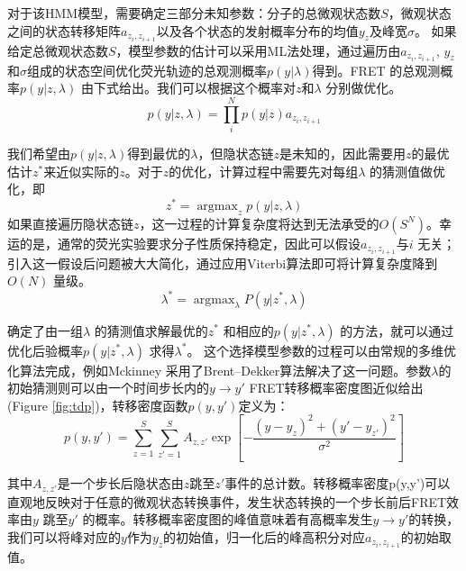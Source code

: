 \documentclass[11pt, a4paper]{article}
\DeclareMathOperator*{\argmax}{argmax}
\begin{document}
对于该HMM模型，需要确定三部分未知参数：分子的总微观状态数$S$，微观状态之间的状态转移矩阵$a_{z_i, z_{i+1}}$以及各个状态的发射概率分布的均值$y_{z}$及峰宽$\sigma$。 如果给定总微观状态数$S$，模型参数的估计可以采用ML法处理，通过遍历由$a_{z_{i}, z_{i+1}}$, $y_{z} $和$\sigma$组成的状态空间优化荧光轨迹的总观测概率$p(y| \lambda)$得到。FRET 的总观测概率$p(y|z,\lambda)$ 由下式给出。我们可以根据这个概率对$z$和$\lambda$ 分别做优化。
\begin{equation}
p(y|z,\lambda)= \prod_i^N p(y|z) a_{z_{i}, z_{i+1}}
\end{equation}


我们希望由$p(y|z,\lambda)$得到最优的$\lambda$，但隐状态链$z$是未知的，因此需要用$z$的最优估计$z^*$来近似实际的$z$。对于$z$的优化，计算过程中需要先对每组$\lambda$ 的猜测值做优化，即
\begin{equation}\label{eqn:z_opt}
  z^*=\argmax_z p(y|z, \lambda)
\end{equation}
如果直接遍历隐状态链$z$，这一过程的计算复杂度将达到无法承受的$O(S^N)$。幸运的是，通常的荧光实验要求分子性质保持稳定，因此可以假设$a_{z_{i}, z_{i+1}}$与$i$ 无关；引入这一假设后问题被大大简化，通过应用Viterbi算法即可将计算复杂度降到$O(N)$ 量级。
\begin{equation}
\lambda^*=\argmax_{\lambda} P(y|z^*,\lambda)
\end{equation}

确定了由一组$\lambda$ 的猜测值求解最优的$z^*$ 和相应的$p(y|z^*,\lambda)$ 的方法，就可以通过优化后验概率$p(y|z^*,\lambda)$ 求得$\lambda^*$。 这个选择模型参数的过程可以由常规的多维优化算法完成，例如Mckinney 采用了Brent–Dekker算法解决了这一问题\cite{Brent}。参数$\lambda$的初始猜测则可以由一个时间步长内的$y\rightarrow y'$ FRET转移概率密度图近似给出(Figure \ref{fig:tdp})，转移密度函数$p(y,y')$定义为：
\begin{equation}
p(y,y')=\sum_{z=1}^S \sum_{z'=1}^S A_{z, z'} \exp\left[-\frac{(y- y_{z})^2+(y'- y_{z'})^2}{\sigma^2}\right]
\end{equation}

其中$A_{z,z'}$是一个步长后隐状态由$z$跳至$z'$事件的总计数。转移概率密度p(y,y')可以直观地反映对于任意的微观状态转换事件，发生状态转换的一个步长前后FRET效率由$y$ 跳至$y'$ 的概率。转移概率密度图的峰值意味着有高概率发生$y\rightarrow y'$的转换，我们可以将峰对应的$y$作为$y_z$的初始值，归一化后的峰高积分对应$a_{z_{i}, z_{i+1}}$的初始取值。
\end{document}
